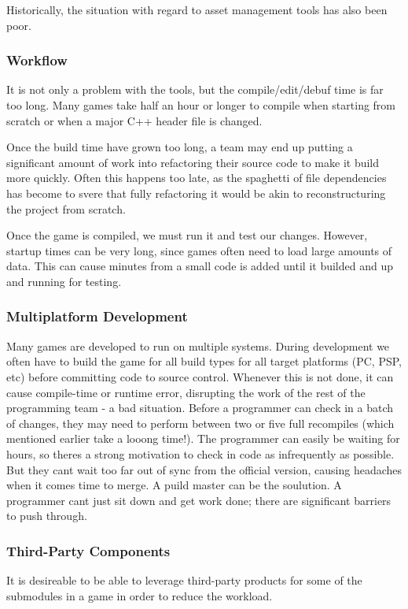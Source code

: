     Historically, the situation with regard to asset management tools has also been poor.

    \subsubsection*{Workflow}
    It is not only a problem with the tools, but the compile/edit/debuf time is far too long. Many games take half an hour or longer to compile when starting from scratch or when a major C++ header file is changed. 

    Once the build time have grown too long, a team may end up putting a significant amount of work into refactoring their source code to make it build more quickly. Often this happens too late, as the spaghetti of file dependencies has become to svere that fully refactoring it would be akin to reconstructuring the project from scratch. 

    Once the game is compiled, we must run it and test our changes. However, startup times can be very long, since games often need to load large amounts of data. This can cause minutes from a small code is added until it builded and up and running for testing. 


    \subsubsection*{Multiplatform Development}
    Many games are developed to run on multiple systems. During development we often have to build the game for all build types for all target platforms (PC, PSP, etc) before committing code to source control. Whenever this is not done, it can cause compile-time or runtime error, disrupting the work of the rest of the programming team - a bad situation. Before a programmer can check in a batch of changes, they may need to perform between two or five full recompiles (which mentioned earlier take a looong time!). The programmer can easily be waiting for hours, so theres a strong motivation to check in code as infrequently as possible. But they cant wait too far out of sync from the official version, causing headaches when it comes time to merge. A puild master can be the soulution. A programmer cant just sit down and get work done; there are significant barriers to push through.  

    \subsubsection*{Third-Party Components}
    It is desireable to be able to leverage third-party products for some of the submodules in a game in order to reduce the workload. 


